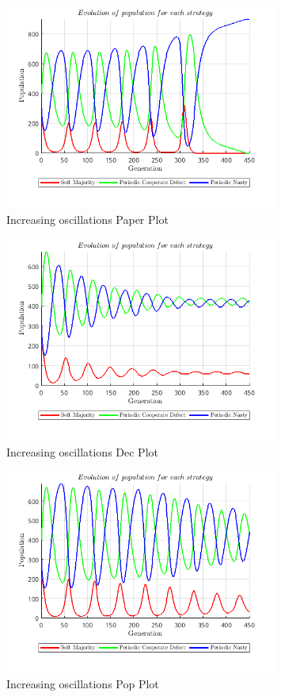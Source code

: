 \documentclass[12pt]{report}
\begin{document}
\begin{figure}[H]
    \centering
    \includegraphics[width=0.8\textwidth]{increasing_oscillations_paper.png}
    \caption{Increasing oscillations Paper Plot}
\end{figure}
\begin{figure}[H]
    \centering
    \includegraphics[width=0.8\textwidth]{increasing_oscillations_dec.png}
    \caption{Increasing oscillations Dec Plot}
\end{figure}
\begin{figure}[H]
    \centering
    \includegraphics[width=0.8\textwidth]{increasing_oscillations_pop.png}
    \caption{Increasing oscillations Pop Plot}
\end{figure}
\end{document}
